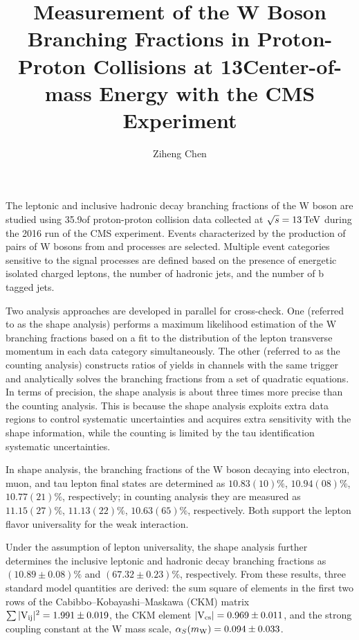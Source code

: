 \documentclass[12pt,reqno]{nuthesis}
\author{Ziheng Chen}
\title{Measurement of the W Boson Branching Fractions in Proton-Proton Collisions at 13\TeV Center-of-mass Energy with the CMS Experiment}
\begin{document}
    
    


    \frontmatter

    \maketitle

    \copyrightpage

    \abstract
    The leptonic and inclusive hadronic decay branching fractions of the W boson are studied using 35.9\fbinv of proton-proton collision data collected at $\sqrt{s}=13\,\text{Te\hspace{-.08em}V}$ during the 2016 run of the CMS experiment. Events characterized by the production of pairs of W bosons from \ttbar and \tW processes are selected. Multiple event categories sensitive to the signal processes are defined based on the presence of energetic isolated charged leptons, the number of hadronic jets, and the number of b tagged jets.  
    
    Two analysis approaches are developed in parallel for cross-check. One (referred to as the shape analysis) performs a maximum likelihood estimation of the W branching fractions based on a fit to the distribution of the lepton transverse momentum in each data category simultaneously. The other (referred to as the counting analysis) constructs ratios of yields in channels with the same trigger and analytically solves the branching fractions from a set of quadratic equations. In terms of precision, the shape analysis is about three times more precise than the counting analysis. This is because the shape analysis exploits extra data regions to control systematic uncertainties and acquires extra sensitivity with the shape information, while the counting is limited by the tau identification systematic uncertainties.
    
    
    In shape analysis, the branching fractions of the W boson decaying into electron, muon, and tau lepton final states are determined as $10.83(10)\%$, $10.94(08)\%$, $10.77(21)\%$, respectively; in counting analysis they are measured as $11.15(27)\%$, $11.13(22)\%$, $10.63(65)\%$, respectively. Both support the lepton flavor universality for the weak interaction. 
    
    Under the assumption of lepton universality, the shape analysis further determines the inclusive leptonic and hadronic decay branching fractions as $(10.89 \pm 0.08)\%$ and $(67.32 \pm 0.23)\%$, respectively. From these results, three standard model quantities are derived: the sum square of elements in the first two rows of the Cabibbo--Kobayashi--Maskawa (CKM) matrix  $\sum{\ensuremath{\lvert \mathrm{V_{ij}} \rvert}^{2}} = 1.991 \pm 0.019$, the CKM element $\lvert \mathrm{V_{cs}} \rvert = 0.969 \pm 0.011$, and the strong coupling constant at the W mass scale, $\alpha_S(m_\mathrm{W}) = 0.094 \pm 0.033$.
\end{document}
